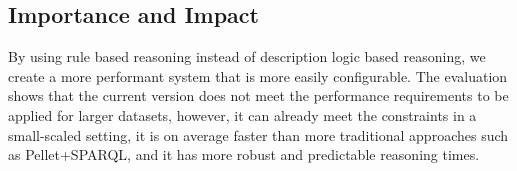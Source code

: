   
  
  
  
  
%   
  
%                 
  
  
\subsection{Importance and Impact}

By using rule based reasoning instead of description logic based reasoning, we create a more performant system that is more easily configurable.
The evaluation shows that the current version does not meet the performance requirements to be applied for larger datasets, however, it can already meet the constraints in a small-scaled setting, it is on average faster than more traditional approaches such as Pellet+SPARQL, and it has more robust and predictable reasoning times.

